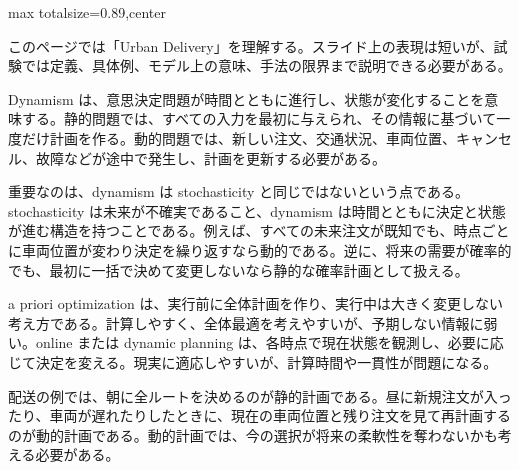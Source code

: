\begin{minipage}[t]{0.58\textwidth}
\begin{adjustbox}{max totalsize={\textwidth}{0.89\textheight},center}
\begin{minipage}{\textwidth}\scriptsize
{}このページでは「Urban Delivery」を理解する。スライド上の表現は短いが、試験では定義、具体例、モデル上の意味、手法の限界まで説明できる必要がある。\par
Dynamism は、意思決定問題が時間とともに進行し、状態が変化することを意味する。静的問題では、すべての入力を最初に与えられ、その情報に基づいて一度だけ計画を作る。動的問題では、新しい注文、交通状況、車両位置、キャンセル、故障などが途中で発生し、計画を更新する必要がある。\par
重要なのは、dynamism は stochasticity と同じではないという点である。stochasticity は未来が不確実であること、dynamism は時間とともに決定と状態が進む構造を持つことである。例えば、すべての未来注文が既知でも、時点ごとに車両位置が変わり決定を繰り返すなら動的である。逆に、将来の需要が確率的でも、最初に一括で決めて変更しないなら静的な確率計画として扱える。\par
a priori optimization は、実行前に全体計画を作り、実行中は大きく変更しない考え方である。計算しやすく、全体最適を考えやすいが、予期しない情報に弱い。online または dynamic planning は、各時点で現在状態を観測し、必要に応じて決定を変える。現実に適応しやすいが、計算時間や一貫性が問題になる。\par
配送の例では、朝に全ルートを決めるのが静的計画である。昼に新規注文が入ったり、車両が遅れたりしたときに、現在の車両位置と残り注文を見て再計画するのが動的計画である。動的計画では、今の選択が将来の柔軟性を奪わないかも考える必要がある。\par

\end{minipage}
\end{adjustbox}
\end{minipage}
